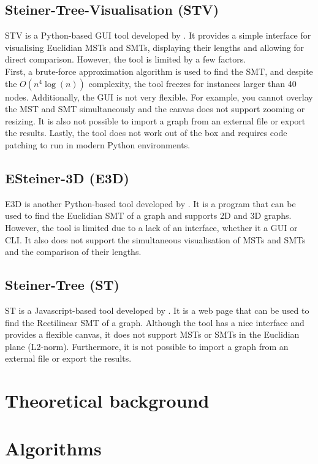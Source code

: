 \documentclass{l4proj}
\begin{document}
\subsection{Steiner-Tree-Visualisation (STV)}
STV is a Python-based GUI tool developed by \cite{Steiner-Tree-Visualisation}. It provides a simple interface for visualising Euclidian MSTs and SMTs, displaying their lengths and allowing for direct comparison. However, the tool is limited by a few factors.
\\
First, a brute-force approximation algorithm is used to find the SMT, and despite the ${O(n^4 \log(n))}$ complexity, the tool freezes for instances larger than 40 nodes.
Additionally, the GUI is not very flexible. For example, you cannot overlay the MST and SMT simultaneously and the canvas does not support zooming or resizing. It is also not possible to import a graph from an external file or export the results.
Lastly, the tool does not work out of the box and requires code patching to run in modern Python environments.

\subsection{ESteiner-3D (E3D)}
E3D is another Python-based tool developed by \cite{ESteiner-3D}. It is a program that can be used to find the Euclidian SMT of a graph and supports 2D and 3D graphs. However, the tool is limited due to a lack of an interface, whether it a GUI or CLI. It also does not support the simultaneous visualisation of MSTs and SMTs and the comparison of their lengths.

\subsection{Steiner-Tree (ST)}
ST is a Javascript-based tool developed by \cite{Steiner-Tree}. It is a web page that can be used to find the Rectilinear SMT of a graph. Although the tool has a nice interface and provides a flexible canvas, it does not support MSTs or SMTs in the Euclidian plane (L2-norm). Furthermore, it is not possible to import a graph from an external file or export the results.

\section{Theoretical background}

\section{Algorithms}
\end{document}
